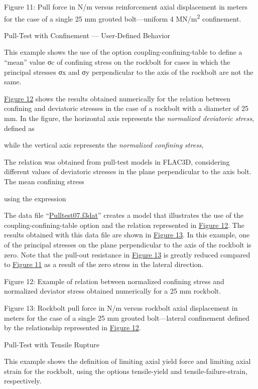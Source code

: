 \documentclass[a4paper, nobind]{templates/ociamthesis}
\begin{document}
Figure 11: Pull force in N/m versus reinforcement axial
displacement in meters for the case of a single 25 mm grouted
bolt---uniform 4
MN/m\textsuperscript{2} confinement.

Pull-Test with Confinement --- User-Defined Behavior

This example shows the use of the option coupling-confining-table to
define a ``mean'' value σc of confining stress on the
rockbolt for cases in which the principal stresses σx and σy
perpendicular to the axis of the rockbolt are not the same.

\protect\hyperlink{pulltest-numericalexample}{Figure 12} shows the results obtained
numerically for the relation between confining and deviatoric stresses
in the
case of a rockbolt with a diameter of 25 mm. In the figure, the
horizontal axis
represents the \emph{normalized deviatoric stress}, defined as

while the vertical axis represents the \emph{normalized confining
stress},

The relation was obtained from pull-test models in FLAC3D, considering
different values of deviatoric
stresses in the plane perpendicular to the axis bolt. The mean confining
stress

using the expression

The data file ``\protect\hyperlink{pulltest07data}{Pulltest07.f3dat}'' creates a model that
illustrates the use of the coupling-confining-table
option and the relation represented in \protect\hyperlink{pulltest-numericalexample}{Figure
12}. The results obtained with this
data file are shown in \protect\hyperlink{pulltest-pile4}{Figure 13}. In this example,
one of the principal stresses on the plane perpendicular to the axis of
the
rockbolt is zero. Note that the pull-out resistance in \protect\hyperlink{pulltest-pile4}{Figure
13} is greatly reduced compared to \protect\hyperlink{pulltest-pile3}{Figure
11} as a result of the zero stress in the
lateral direction.

Figure 12: Example of relation between normalized confining
stress and normalized deviator stress obtained numerically for a 25 mm
rockbolt.

Figure 13: Rockbolt pull force in N/m versus rockbolt axial
displacement in meters for the case of a single 25 mm grouted
bolt---lateral
confinement defined by the relationship represented in \protect\hyperlink{pulltest-numericalexample}{Figure
12}.

Pull-Test with Tensile
Rupture

This example shows the definition of limiting axial yield force and
limiting
axial strain for the rockbolt, using the options tensile-yield and
tensile-failure-strain, respectively.
\end{document}
